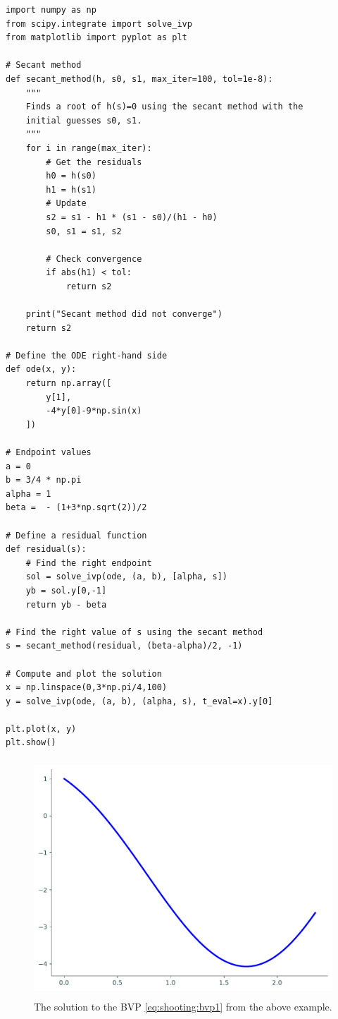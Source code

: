 \begin{lstlisting}
import numpy as np
from scipy.integrate import solve_ivp
from matplotlib import pyplot as plt

# Secant method
def secant_method(h, s0, s1, max_iter=100, tol=1e-8):
    """
    Finds a root of h(s)=0 using the secant method with the
    initial guesses s0, s1.
    """
    for i in range(max_iter):
        # Get the residuals
        h0 = h(s0)
        h1 = h(s1)
        # Update
        s2 = s1 - h1 * (s1 - s0)/(h1 - h0)
        s0, s1 = s1, s2

        # Check convergence
        if abs(h1) < tol:
            return s2

    print("Secant method did not converge")
    return s2

# Define the ODE right-hand side
def ode(x, y):
    return np.array([
        y[1],
        -4*y[0]-9*np.sin(x)
    ])

# Endpoint values
a = 0
b = 3/4 * np.pi
alpha = 1
beta =  - (1+3*np.sqrt(2))/2

# Define a residual function
def residual(s):
    # Find the right endpoint
    sol = solve_ivp(ode, (a, b), [alpha, s])
    yb = sol.y[0,-1]
    return yb - beta

# Find the right value of s using the secant method
s = secant_method(residual, (beta-alpha)/2, -1)

# Compute and plot the solution
x = np.linspace(0,3*np.pi/4,100)
y = solve_ivp(ode, (a, b), (alpha, s), t_eval=x).y[0]

plt.plot(x, y)
plt.show()
\end{lstlisting}

\begin{figure}[H]
\includegraphics[height=3.5in]{figures/example1.pdf}
\caption{The solution to the BVP \eqref{eq:shooting:bvp1} from the above example.}
\label{fig:shooting:shooting1}
\end{figure}

